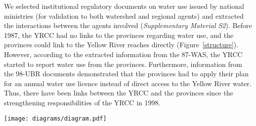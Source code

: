 We selected institutional regulatory documents on water use issued by national ministries (for validation to both watershed and regional agents) and extracted the interactions between the agents involved (\textit{Supplementary Material S2}).
Before 1987, the YRCC had no links to the provinces regarding water use, and the provinces could link to the Yellow River reaches directly (Figure~\ref{structure}).
However, according to the extracted information from the 87-WAS, the YRCC started to report water use from the provinces.
Furthermore, information from the 98-UBR documents demonstrated that the provinces had to apply their plan for an annual water use licence instead of direct access to the Yellow River water.
Thus, there have been links between the YRCC and the provinces since the strengthening responsibilities of the YRCC in 1998.

\begin{figure*}[!h]
    \texttt{[image: diagrams/diagram.pdf]}
	\caption{
		Institutional shifts and related SES structures in the Yellow River Basin (YRB). See \textit{Supplementary Material S1} for detailed introduction for the institutions.
	}
	\label{structure}
\end{figure*}

